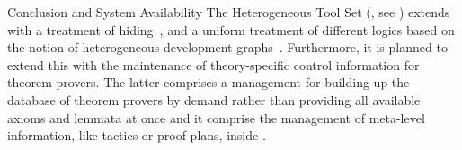 \begin{omgroup}[id=maya,short=\maya,creators={autexier,hutter,mossakowski,shairer}]
\begin{omgroup}{Conclusion and System Availability}
The Heterogeneous Tool Set ({\hets}, see ) extends {\maya} with a treatment
of hiding~\cite{MAH-06-a}, and a uniform treatment of different logics based on the notion
of heterogeneous development graphs~\cite{Mossakowski:tdghb02}.  Furthermore, it is planned
to extend this with the maintenance of theory-specific control information for theorem
provers. The latter comprises a management for building up the database of theorem provers
by demand rather than providing all available axioms and lemmata at once and it comprise
the management of meta-level information, like tactics or proof plans, inside {\maya}.
\end{omgroup}
\end{omgroup}
